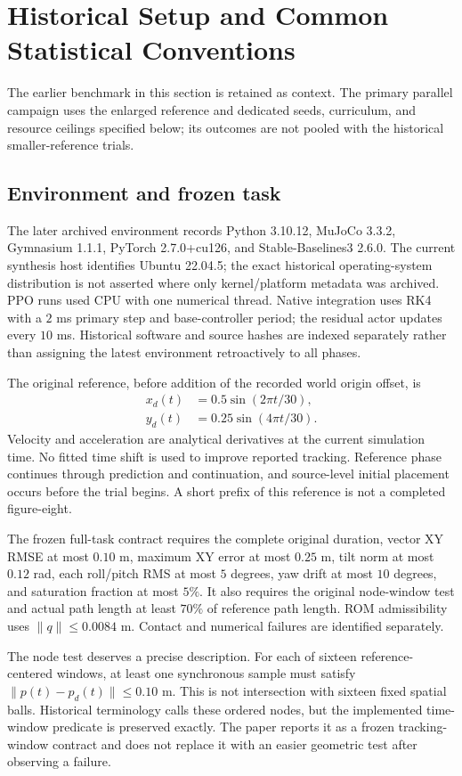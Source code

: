 \section{Historical Setup and Common Statistical Conventions}
The earlier benchmark in this section is retained as context. The primary parallel campaign uses the enlarged reference and dedicated seeds, curriculum, and resource ceilings specified below; its outcomes are not pooled with the historical smaller-reference trials.
\subsection{Environment and frozen task}
The later archived environment records Python 3.10.12, MuJoCo 3.3.2, Gymnasium 1.1.1, PyTorch 2.7.0+cu126, and Stable-Baselines3 2.6.0. The current synthesis host identifies Ubuntu 22.04.5; the exact historical operating-system distribution is not asserted where only kernel/platform metadata was archived. PPO runs used CPU with one numerical thread. Native integration uses RK4 with a $2$ ms primary step and base-controller period; the residual actor updates every $10$ ms. Historical software and source hashes are indexed separately rather than assigning the latest environment retroactively to all phases.

The original reference, before addition of the recorded world origin offset, is
\begin{align}
 x_d(t)&=0.5\sin(2\pi t/30),\\
 y_d(t)&=0.25\sin(4\pi t/30).
\end{align}
Velocity and acceleration are analytical derivatives at the current simulation time. No fitted time shift is used to improve reported tracking. Reference phase continues through prediction and continuation, and source-level initial placement occurs before the trial begins. A short prefix of this reference is not a completed figure-eight.

The frozen full-task contract requires the complete original duration, vector XY RMSE at most $0.10$ m, maximum XY error at most $0.25$ m, tilt norm at most $0.12$ rad, each roll/pitch RMS at most $5$ degrees, yaw drift at most $10$ degrees, and saturation fraction at most $5\%$. It also requires the original node-window test and actual path length at least $70\%$ of reference path length. ROM admissibility uses $\|q\|\leq0.0084$ m. Contact and numerical failures are identified separately.

The node test deserves a precise description. For each of sixteen reference-centered windows, at least one synchronous sample must satisfy $\|p(t)-p_d(t)\|\leq0.10$ m. This is not intersection with sixteen fixed spatial balls. Historical terminology calls these ordered nodes, but the implemented time-window predicate is preserved exactly. The paper reports it as a frozen tracking-window contract and does not replace it with an easier geometric test after observing a failure.

